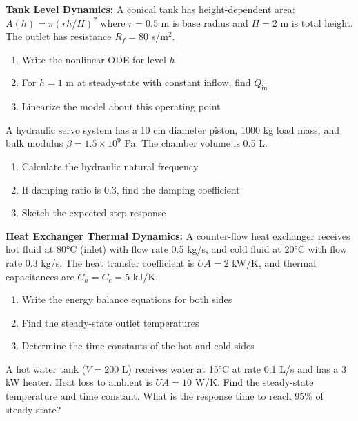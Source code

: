 \begin{exercise}
\textbf{Tank Level Dynamics:} A conical tank has height-dependent area: $A(h) = \pi(rh/H)^2$ where $r = 0.5$ m is base radius and $H = 2$ m is total height. The outlet has resistance $R_f = 80$ s/m$^2$.
\begin{enumerate}[label=(\alph*)]
    \item Write the nonlinear ODE for level $h$
    \item For $h = 1$ m at steady-state with constant inflow, find $Q_{\text{in}}$
    \item Linearize the model about this operating point
\end{enumerate}
\end{exercise}

\begin{exercise}
A hydraulic servo system has a 10 cm diameter piston, 1000 kg load mass, and bulk modulus $\beta = 1.5 \times 10^9$ Pa. The chamber volume is 0.5 L.
\begin{enumerate}[label=(\alph*)]
    \item Calculate the hydraulic natural frequency
    \item If damping ratio is 0.3, find the damping coefficient
    \item Sketch the expected step response
\end{enumerate}
\end{exercise}

\begin{exercise}
\textbf{Heat Exchanger Thermal Dynamics:} A counter-flow heat exchanger receives hot fluid at 80°C (inlet) with flow rate 0.5 kg/s, and cold fluid at 20°C with flow rate 0.3 kg/s. The heat transfer coefficient is $UA = 2$ kW/K, and thermal capacitances are $C_h = C_c = 5$ kJ/K.
\begin{enumerate}[label=(\alph*)]
    \item Write the energy balance equations for both sides
    \item Find the steady-state outlet temperatures
    \item Determine the time constants of the hot and cold sides
\end{enumerate}
\end{exercise}

\begin{exercise}
A hot water tank ($V = 200$ L) receives water at 15°C at rate 0.1 L/s and has a 3 kW heater. Heat loss to ambient is $UA = 10$ W/K. Find the steady-state temperature and time constant. What is the response time to reach 95\% of steady-state?
\end{exercise}
